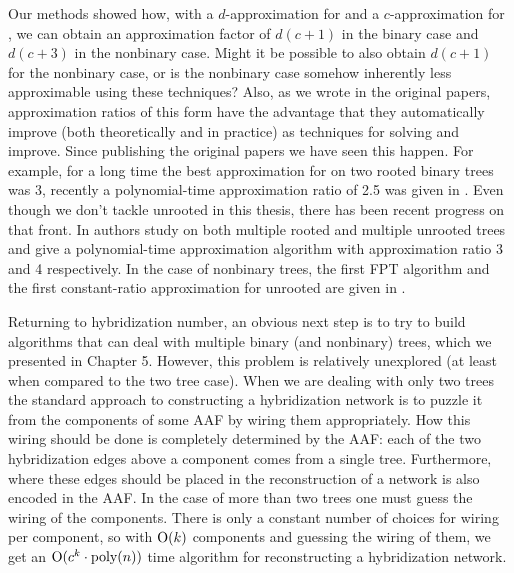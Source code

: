 Our methods showed how, with a $d$-approximation for \dfvs and a $c$-approximation for \maf, we can obtain an approximation factor of $d(c+1)$ in the binary case and $d(c+3)$ in the nonbinary case. Might it be possible to also obtain $d(c+1)$ for the
nonbinary case, or is the nonbinary case somehow inherently less approximable using these techniques? Also, as we wrote in the original papers, approximation ratios of this form have the advantage that they automatically improve (both theoretically
and in practice) as techniques for solving \dfvs and \maf improve. Since publishing the original papers we have seen this happen. For example, for a long time the best approximation for \maf on two rooted binary trees was 3, recently a polynomial-time approximation ratio of 2.5 was given in \cite{conc3}. Even though we don't tackle unrooted \maf in this thesis, there has been recent progress on that front. In \cite{conc1} authors study \maf on both multiple rooted and multiple unrooted trees and give a polynomial-time approximation algorithm with approximation ratio 3 and 4 respectively. In the case of nonbinary trees, the first FPT algorithm and the first constant-ratio approximation for unrooted \maf are given in \cite{conc2}. 




Returning to hybridization number, an obvious next step is to try to build algorithms that can deal with multiple binary (and nonbinary) trees, which we presented in Chapter 5. However, this problem is relatively unexplored (at least when compared to the two tree case). When we are dealing with only two trees the standard approach to constructing a hybridization network is to puzzle it from the components of some AAF by wiring them appropriately. How this wiring should be done is completely determined by the AAF: each of the two hybridization edges above a component comes from a single tree. Furthermore, where these edges should be placed in the reconstruction of a network is also encoded in the AAF. In the case of more than two trees one must guess the wiring of the components. There is only a constant number of choices for wiring per component, so with $\mathrm{O}(k)$ components and guessing the wiring of them, we get an $\mathrm{O}(c^k \cdot \text{poly}(n))$ time algorithm for reconstructing a hybridization network. 


